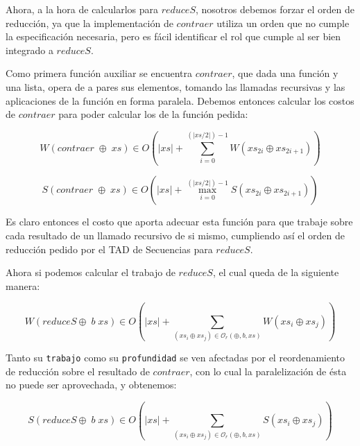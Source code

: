 \documentclass[a4paper,10pt]{article}
\begin{document}
    Ahora, a la hora de calcularlos para $reduceS$, nosotros debemos forzar
el orden de reducción, ya que la implementación de $contraer$ utiliza un orden
que no cumple la especificación necesaria, pero es fácil identificar el rol que
cumple al ser bien integrado a $reduceS$.

    Como primera función auxiliar se encuentra $contraer$, que dada una función y
una lista, opera de a pares sus elementos, tomando las llamadas recursivas y las 
aplicaciones de la función en forma paralela. Debemos entonces calcular los costos
de $contraer$ para poder calcular los de la función pedida:

\begin{equation*}
    W \left( contraer \;\oplus \;xs \right) \in
    O \left( \vert xs \vert + \sum_{i=0}^{(\vert xs / 2 \vert) - 1} W \left( xs_{2i} \oplus xs_{2i+1} \right) \right)
\end{equation*}

\begin{equation*}
    S \left( contraer \;\oplus \;xs \right) \in
    O \left( \vert xs \vert + \max_{i=0}^{(\vert xs / 2 \vert) - 1} S \left( xs_{2i} \oplus xs_{2i+1} \right) \right)
\end{equation*}

\smallskip

    Es claro entonces el costo que aporta adecuar esta función para que trabaje sobre
cada resultado de un llamado recursivo de si mismo, cumpliendo así el orden de
reducción pedido por el TAD de Secuencias para $reduceS$.

    Ahora si podemos calcular el trabajo de $reduceS$, el cual queda de la siguiente
manera: 

\begin{equation*}
    W \left( reduceS \oplus \; b \; xs \right) \in
    O \left( \vert xs \vert + \sum_{(xs_i \oplus xs_j) \in \mathcal{O}_r(\oplus,b,xs)} W \left( xs_i \oplus xs_j \right) \right)
\end{equation*}

\bigskip

    Tanto su \texttt{trabajo} como su \texttt{profundidad} se ven afectadas por
el reordenamiento de reducción sobre el resultado de $contraer$, con lo cual la paralelización
de ésta no puede ser aprovechada, y obtenemos:

\begin{equation*}
    S \left( reduceS \oplus \; b \; xs \right) \in
    O \left( \vert xs \vert + \sum_{(xs_i \oplus xs_j) \in \mathcal{O}_r(\oplus,b,xs)} S \left( xs_i \oplus xs_j \right) \right)
\end{equation*}
\end{document}
